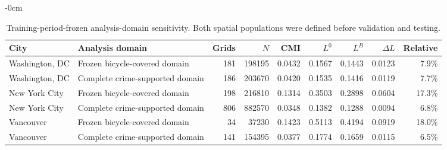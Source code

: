 
\begin{table}[!htbp]
\begin{adjustwidth}{-\extralength}{0cm}
\caption{Training-period-frozen analysis-domain sensitivity. Both spatial populations were defined before validation and testing.}
\label{tab:sup_frozen_domain}
\centering
\scriptsize
\setlength{\tabcolsep}{3pt}
\begin{tabular*}{\linewidth}{@{\extracolsep{\fill}}llrrrrrrr@{}}
\toprule
\textbf{City} & \textbf{Analysis domain} & \textbf{Grids} & \textbf{$N$} & \textbf{CMI} & \textbf{$L^0$} & \textbf{$L^B$} & \textbf{$\Delta L$} & \textbf{Relative}\\
\midrule
Washington, DC & Frozen bicycle-covered domain & 181 & 198195 & 0.0432 & 0.1567 & 0.1443 & 0.0123 & 7.9\%\\
Washington, DC & Complete crime-supported domain & 186 & 203670 & 0.0420 & 0.1535 & 0.1416 & 0.0119 & 7.7\%\\
New York City & Frozen bicycle-covered domain & 198 & 216810 & 0.1314 & 0.3503 & 0.2898 & 0.0604 & 17.3\%\\
New York City & Complete crime-supported domain & 806 & 882570 & 0.0348 & 0.1382 & 0.1288 & 0.0094 & 6.8\%\\
Vancouver & Frozen bicycle-covered domain & 34 & 37230 & 0.1423 & 0.5113 & 0.4194 & 0.0919 & 18.0\%\\
Vancouver & Complete crime-supported domain & 141 & 154395 & 0.0377 & 0.1774 & 0.1659 & 0.0115 & 6.5\%\\
\bottomrule
\end{tabular*}
\end{adjustwidth}
\end{table}
